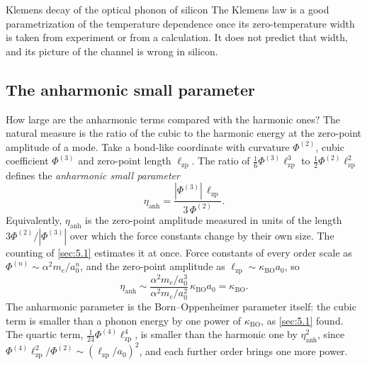 \begin{workedexample}{Klemens decay of the optical phonon of silicon}
The Klemens law is a good parametrization of the temperature dependence once its zero-temperature width is taken from experiment or from a calculation. It does not predict that width, and its picture of the channel is wrong in silicon.
\end{workedexample}

\subsection{The anharmonic small parameter}

How large are the anharmonic terms compared with the harmonic ones? The natural measure is the ratio of the cubic to the harmonic energy at the zero-point amplitude of a mode. Take a bond-like coordinate with curvature $\Phi^{(2)}$, cubic coefficient $\Phi^{(3)}$ and zero-point length $\ell_{\mathrm{zp}}$. The ratio of $\tfrac16\Phi^{(3)}\ell_{\mathrm{zp}}^3$ to $\tfrac12\Phi^{(2)}\ell_{\mathrm{zp}}^2$ defines the \emph{anharmonic small parameter}
\begin{equation}
  \eta_{\mathrm{anh}} = \frac{|\Phi^{(3)}|\,\ell_{\mathrm{zp}}}{3\,\Phi^{(2)}} .
  \label{eq:5.7-eta}
\end{equation}
Equivalently, $\eta_{\mathrm{anh}}$ is the zero-point amplitude measured in units of the length $3\Phi^{(2)}/|\Phi^{(3)}|$ over which the force constants change by their own size. The counting of \cref{sec:5.1} estimates it at once. Force constants of every order scale as $\Phi^{(n)} \sim \alpha^2m_e/a_0^n$, and the zero-point amplitude as $\ell_{\mathrm{zp}} \sim \kappa_{\mathrm{BO}}a_0$, so
\begin{equation*}
  \eta_{\mathrm{anh}} \sim \frac{\alpha^2m_e/a_0^3}{\alpha^2m_e/a_0^2}\,\kappa_{\mathrm{BO}}a_0 = \kappa_{\mathrm{BO}} .
\end{equation*}
The anharmonic parameter is the Born--Oppenheimer parameter itself: the cubic term is smaller than a phonon energy by one power of $\kappa_{\mathrm{BO}}$, as \cref{sec:5.1} found. The quartic term, $\tfrac1{24}\Phi^{(4)}\ell_{\mathrm{zp}}^4$, is smaller than the harmonic one by $\eta_{\mathrm{anh}}^2$, since $\Phi^{(4)}\ell_{\mathrm{zp}}^2/\Phi^{(2)} \sim (\ell_{\mathrm{zp}}/a_0)^2$, and each further order brings one more power.

